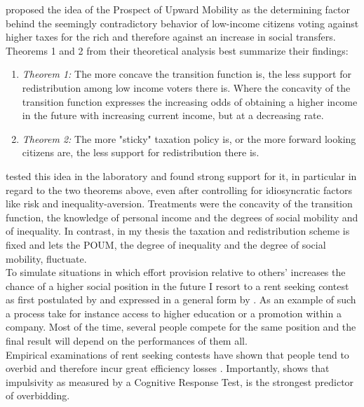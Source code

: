 \cite{ok2000} proposed the idea of the Prospect of Upward Mobility as the determining factor behind the seemingly contradictory behavior of low-income citizens voting against higher taxes for the rich and therefore against an increase in social transfers.\\
Theorems 1 and 2 from their theoretical analysis best summarize their findings:
\begin{enumerate}
    \item \textit{Theorem 1:} The more concave the transition function is, the less support for redistribution among low income voters there is. Where the concavity of the transition function expresses the increasing odds of obtaining a higher income in the future with increasing current income, but at a decreasing rate.  
    \item \textit{Theorem 2:} The more "sticky" taxation policy is, or the more forward looking citizens are, the less support for redistribution there is.
\end{enumerate}

\cite{checchi2003} tested this idea in the laboratory and found strong support for it, in particular in regard to the two theorems above, even after controlling for idiosyncratic factors like risk and inequality-aversion. Treatments were the concavity of the transition function, the knowledge of personal income and the degrees of social mobility and of inequality. In contrast, in my thesis the taxation and redistribution scheme is fixed and lets the POUM, the degree of inequality and the degree of social mobility, fluctuate.\\

To simulate situations in which effort provision relative to others' increases the chance of a higher social position in the future I resort to a rent seeking contest as first postulated by \cite{tullock1980} and expressed in a general form by \cite{sheremeta2010a}. As an example of such a process take for instance access to higher education or a promotion within a company. Most of the time, several people compete for the same position and the final result will depend on the performances of them all.\\
Empirical examinations of rent seeking contests have shown that people tend to overbid and therefore incur great efficiency losses \citep{sheremeta2016, chowdhury2014, konrad2009, dechenaux2015}. Importantly, \cite{sheremeta2016} shows that impulsivity as measured by a Cognitive Response Test, is the strongest predictor of overbidding.\\